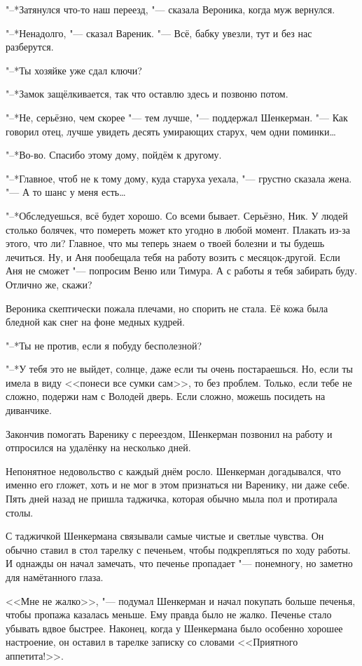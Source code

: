 "--*Затянулся что-то наш переезд, "--- сказала Вероника, когда муж вернулся.

"--*Ненадолго, "--- сказал Вареник.
"--- Всё, бабку увезли, тут и без нас разберутся.

"--*Ты хозяйке уже сдал ключи?

"--*Замок защёлкивается, так что оставлю здесь и позвоню потом.

"--*Не, серьёзно, чем скорее "--- тем лучше, "--- поддержал Шенкерман.
"--- Как говорил отец, лучше увидеть десять умирающих старух, чем одни поминки\ldots{}

"--*Во-во.
Спасибо этому дому, пойдём к другому.

"--*Главное, чтоб не к тому дому, куда старуха уехала, "--- грустно сказала жена.
"--- А то шанс у меня есть\ldots{}

"--*Обследуешься, всё будет хорошо.
Со всеми бывает.
Серьёзно, Ник.
У людей столько болячек, что помереть может кто угодно в любой момент.
Плакать из-за этого, что ли?
Главное, что мы теперь знаем о твоей болезни и ты будешь лечиться.
Ну, и Аня пообещала тебя на работу возить с месяцок-другой.
Если Аня не сможет "--- попросим Веню или Тимура.
А с работы я тебя забирать буду.
Отлично же, скажи?

Вероника скептически пожала плечами, но спорить не стала.
Её кожа была бледной как снег на фоне медных кудрей.

"--*Ты не против, если я побуду бесполезной?

"--*У тебя это не выйдет, солнце, даже если ты очень постараешься.
Но, если ты имела в виду <<понеси все сумки сам>>, то без проблем.
Только, если тебе не сложно, подержи нам с Володей дверь.
Если сложно, можешь посидеть на диванчике.

\asterism

Закончив помогать Варенику с переездом, Шенкерман позвонил на работу и отпросился на удалёнку на несколько дней.

Непонятное недовольство с каждый днём росло.
Шенкерман догадывался, что именно его гложет, хоть и не мог в этом признаться ни Варенику, ни даже себе.
Пять дней назад не пришла таджичка, которая обычно мыла пол и протирала столы.

С таджичкой Шенкермана связывали самые чистые и светлые чувства.
Он обычно ставил в стол тарелку с печеньем, чтобы подкрепляться по ходу работы.
И однажды он начал замечать, что печенье пропадает "--- понемногу, но заметно для намётанного глаза.

<<Мне не жалко>>, "--- подумал Шенкерман и начал покупать больше печенья, чтобы пропажа казалась меньше.
Ему правда было не жалко.
Печенье стало убывать вдвое быстрее.
Наконец, когда у Шенкермана было особенно хорошее настроение, он оставил в тарелке записку со словами <<Приятного аппетита!>>.

